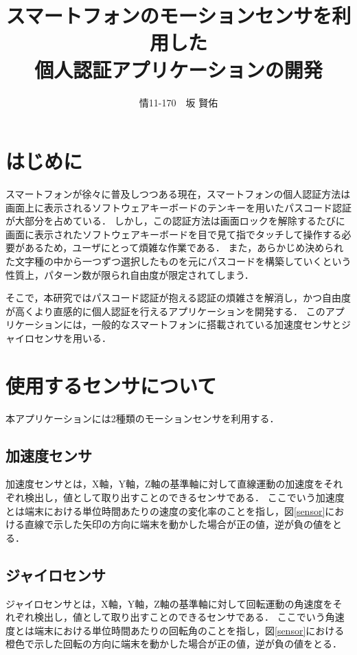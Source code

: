 \documentclass[11pt]{jreport}
\title{\bfseries スマートフォンのモーションセンサを利用した\\個人認証アプリケーションの開発}
\author{情11-170　\UTF{9AD9}坂 賢佑}
\date{}
\begin{document}
\maketitle

\tableofcontents
\listoffigures

\chapter*{はじめに}
スマートフォンが徐々に普及しつつある現在，スマートフォンの個人認証方法は画面上に表示されるソフトウェアキーボードのテンキーを用いたパスコード認証が大部分を占めている．
しかし，この認証方法は画面ロックを解除するたびに画面に表示されたソフトウェアキーボードを目で見て指でタッチして操作する必要があるため，ユーザにとって煩雑な作業である．
また，あらかじめ決められた文字種の中から一つずつ選択したものを元にパスコードを構築していくという性質上，パターン数が限られ自由度が限定されてしまう．

そこで，本研究ではパスコード認証が抱える認証の煩雑さを解消し，かつ自由度が高くより直感的に個人認証を行えるアプリケーションを開発する．
このアプリケーションには，一般的なスマートフォンに搭載されている加速度センサとジャイロセンサを用いる．

\chapter{使用するセンサについて}
本アプリケーションには2種類のモーションセンサを利用する．

    \section{加速度センサ}
    加速度センサとは，X軸，Y軸，Z軸の基準軸に対して直線運動の加速度をそれぞれ検出し，値として取り出すことのできるセンサである．
    ここでいう加速度とは端末における単位時間あたりの速度の変化率のことを指し，図\ref{sensor}における直線で示した矢印の方向に端末を動かした場合が正の値，逆が負の値をとる．

    \section{ジャイロセンサ}
    ジャイロセンサとは，X軸，Y軸，Z軸の基準軸に対して回転運動の角速度をそれぞれ検出し，値として取り出すことのできるセンサである．
    ここでいう角速度とは端末における単位時間あたりの回転角のことを指し，図\ref{sensor}における橙色で示した回転の方向に端末を動かした場合が正の値，逆が負の値をとる．
\end{document}
